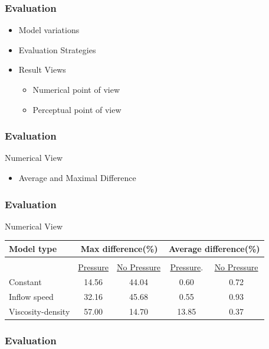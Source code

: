 \documentclass[18pt]{beamer}
\begin{document}
\begin{frame}[t]
  \frametitle{Evaluation}
  \begin{itemize}
  \item Model variations
  \item Evaluation Strategies
  \item Result Views
    \begin{itemize}
    \item Numerical point of view
    \item Perceptual point of view
    \end{itemize}
  \end{itemize}  
\end{frame}

\begin{frame}[t]
  \frametitle{Evaluation}
  \large{Numerical View}
  \begin{itemize}
  \item Average and Maximal Difference
  \end{itemize}

\end{frame}

\begin{frame}[t]
  \frametitle{Evaluation}
  \large{Numerical View}
  \begin{table}
  \begin{center}
    \begin{tabular}{lcc|cc}
      \textbf{Model type} & \multicolumn{2}{c|}{\textbf{Max difference(\%) }}  &  \multicolumn{2}{c}{\textbf{Average difference(\%)}}\\
      \hline 
      \multicolumn{3}{c|}{}&&\\
                 & \underline{Pressure} & \underline{No Pressure}  &  \underline{Pressure}.& \underline{No Pressure}\\
      
      Constant           & 14.56 & 44.04 & 0.60  & 0.72   \\
      Inflow speed       & 32.16 & 45.68 & 0.55  & 0.93   \\
      Viscosity-density  & 57.00 & 14.70 & 13.85 & 0.37   \\
    \end{tabular}
  \end{center}
\end{table}
\end{frame}

\begin{frame}[t]
  \frametitle{Evaluation}
\end{frame}
\end{document}

